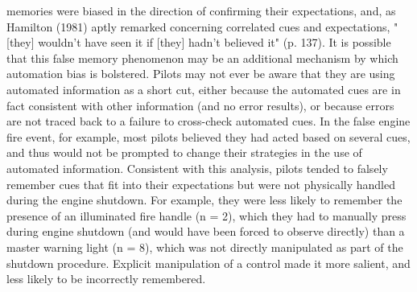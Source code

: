\documentclass[utf8,bachelor,manualbib]{gradu3}
\begin{document}
memories were biased in the direction of confirming their expectations, and, as
Hamilton (1981) aptly remarked concerning correlated cues and expectations,
"[they] wouldn't have seen it if [they] hadn't believed it" (p. 137).
It is possible that this false memory phenomenon may be an additional mechanism
by which automation bias is bolstered. Pilots may not ever be aware that they
are using automated information as a short cut, either because the automated cues
are in fact consistent with other information (and no error results), or because errors
are not traced back to a failure to cross-check automated cues. In the false engine
fire event, for example, most pilots believed they had acted based on several cues,
and thus would not be prompted to change their strategies in the use of automated
information. Consistent with this analysis, pilots tended to falsely remember cues
that fit into their expectations but were not physically handled during the engine
shutdown. For example, they were less likely to remember the presence of an
illuminated fire handle (n = 2), which they had to manually press during engine
shutdown (and would have been forced to observe directly) than a master warning
light (n = 8), which was not directly manipulated as part of the shutdown procedure.
Explicit manipulation of a control made it more salient, and less likely to be
incorrectly remembered. \citep{mosier1998}

\end{document}
